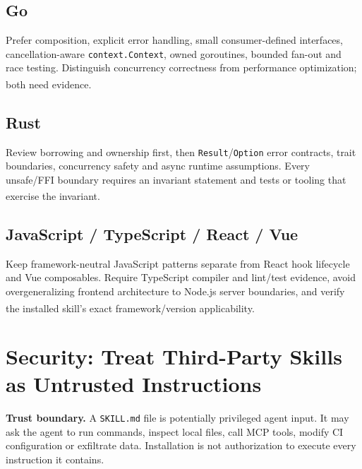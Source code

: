 \documentclass[11pt,letterpaper]{article}
\newcommand{\src}[1]{\textsuperscript{\textcolor{teal}{\cite{#1}}}}
\begin{document}
\subsection{Go}
Prefer composition, explicit error handling, small consumer-defined interfaces, cancellation-aware \texttt{context.Context}, owned goroutines, bounded fan-out and race testing. Distinguish concurrency correctness from performance optimization; both need evidence.\src{goskills,gopatterns}

\subsection{Rust}
Review borrowing and ownership first, then \texttt{Result}/\texttt{Option} error contracts, trait boundaries, concurrency safety and async runtime assumptions. Every unsafe/FFI boundary requires an invariant statement and tests or tooling that exercise the invariant.\src{rustindex,rustpatterns}

\subsection{JavaScript / TypeScript / React / Vue}
Keep framework-neutral JavaScript patterns separate from React hook lifecycle and Vue composables. Require TypeScript compiler and lint/test evidence, avoid overgeneralizing frontend architecture to Node.js server boundaries, and verify the installed skill's exact framework/version applicability.\src{patternsrepo}

\section{Security: Treat Third-Party Skills as Untrusted Instructions}
\begin{insight}
\textbf{Trust boundary.} A \texttt{SKILL.md} file is potentially privileged agent input. It may ask the agent to run commands, inspect local files, call MCP tools, modify CI configuration or exfiltrate data. Installation is not authorization to execute every instruction it contains.
\end{insight}
\end{document}
